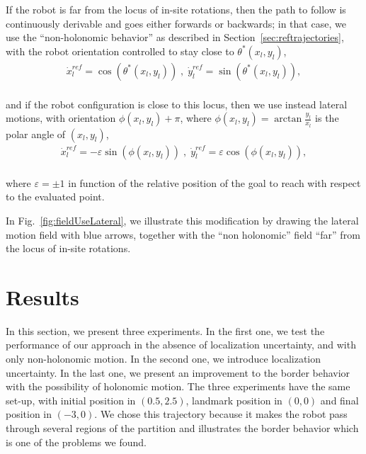 If the robot is far from the locus of in-site rotations, then the path to follow is continuously derivable and goes either forwards or backwards; in that case, we use the ``non-holonomic behavior'' as described in Section~\ref{sec:reftrajectories}, with the robot orientation controlled to stay close to $\theta^*(x_l,y_l)$,
$$
\begin{array}{c}
\dot{x}^{ref}_l  =  \cos(\theta^*(x_l,y_l)) \;,\; \dot{y}^{ref}_l  =  \sin(\theta^*(x_l,y_l)), \\
\end{array}
$$

and if the robot configuration is close to this locus, then we use instead lateral motions, with orientation $\phi(x_l,y_l)+\pi$, where $\phi(x_l,y_l)=\arctan\frac{y_l}{x_l}$ is the polar angle of $(x_l,y_l)$,
$$
\begin{array}{c}
\dot{x}^{ref}_l  =  -\varepsilon\sin(\phi(x_l,y_l)) \;,\; \dot{y}^{ref}_l  =  \varepsilon\cos(\phi(x_l,y_l)),  \\
\end{array}
$$

where $\varepsilon =\pm1$ in function of the relative position of the goal to reach with respect to the evaluated point. 

In Fig.~\ref{fig:fieldUseLateral}, we illustrate this modification by drawing the lateral motion field with blue arrows, together with the ``non holonomic'' field ``far'' from the locus of in-site rotations. 

\section{Results}


In this section, we present three experiments. In the first one, we test the performance of our approach in the absence of localization uncertainty, and with only non-holonomic motion. In the second one, we introduce localization uncertainty. In the last one, we present an improvement to the border behavior with the possibility of holonomic motion. The three experiments have the same set-up, with initial position in $(0.5,2.5)$, landmark position in $(0,0)$ and final position in $(-3,0)$. We chose this trajectory because it makes the robot pass through several regions of the partition and illustrates the border behavior which is one of the problems we found.

